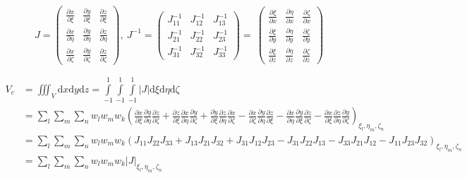 \documentclass[11pt]{article}
\newcommand{\Vc}{V_c}
\newcommand{\xxi}{\frac{\partial x}{\partial \xi}}
\newcommand{\yxi}{\frac{\partial y}{\partial \xi}}
\newcommand{\zxi}{\frac{\partial z}{\partial \xi}}
\newcommand{\xeta}{\frac{\partial x}{\partial \eta}}
\newcommand{\yeta}{\frac{\partial y}{\partial \eta}}
\newcommand{\zeeta}{\frac{\partial z}{\partial \eta}}
\newcommand{\xzeta}{\frac{\partial x}{\partial \zeta}}
\newcommand{\yzeta}{\frac{\partial y}{\partial \zeta}}
\newcommand{\zzeta}{\frac{\partial z}{\partial \zeta}}
\newcommand{\xix}{\frac{\partial \xi}{\partial x}}
\newcommand{\xiy}{\frac{\partial \xi}{\partial y}}
\newcommand{\xiz}{\frac{\partial \xi}{\partial z}}
\newcommand{\etax}{\frac{\partial \eta}{\partial x}}
\newcommand{\etay}{\frac{\partial \eta}{\partial y}}
\newcommand{\etaz}{\frac{\partial \eta}{\partial z}}
\newcommand{\zetax}{\frac{\partial \zeta}{\partial x}}
\newcommand{\zetay}{\frac{\partial \zeta}{\partial y}}
\newcommand{\zetaz}{\frac{\partial \zeta}{\partial z}}
\newcommand{\md}{\mbox{d}}
\newcommand{\Int}{\int\limits}
\begin{document}
\begin{enumerate}
 \begin{equation*}
    J =
    \begin{pmatrix}
    \xxi & \yxi  & \zxi   \\
    \xeta & \yeta & \zeeta   \\
    \xzeta & \yzeta & \zzeta
    \end{pmatrix},\:
    J^{-1} =
    \begin{pmatrix}
    J_{11}^{-1} & J_{12}^{-1}  &  J_{13}^{-1}  \\
    J_{21}^{-1} & J_{22}^{-1} & J_{23}^{-1}   \\
    J_{31}^{-1} & J_{32}^{-1} & J_{33}^{-1}
    \end{pmatrix} =\:
    \begin{pmatrix}
    \xix & \etax  & \zetax   \\
    \xiy & \etay & \zetay   \\
    \xiz & \etaz & \zetaz
    \end{pmatrix}
\end{equation*}

    \begin{align*}
    \Vc &= \iiint_V \md x \md y \md z = \Int_{-1}^{1}  \Int_{-1}^{1} \Int_{-1}^{1} |J| \md \xi \md \eta \md \zeta \\
    &= \sum_l \sum_m \sum_n w_l w_m w_k \left( \xxi \yeta \zzeta + \zxi \xeta \yzeta + \yxi \zeeta \xzeta - \xzeta \yeta \zxi - \xeta \yxi \zzeta - \xxi \zeeta \yzeta \right)_{\xi_l, \eta_m, \zeta_n}\\
    &= \sum_l \sum_m \sum_n w_l w_m w_k \left( J_{11} J_{22} J_{33} + J_{13} J_{21} J_{32} + J_{31} J_{12} J_{23} - J_{31} J_{22} J_{13} - J_{33} J_{21} J_{12} -J_{11} J_{23} J_{32}\right)_{\xi_l, \eta_m, \zeta_n} \\
    &= \sum_l \sum_m \sum_n w_l w_m w_k |J|_{\xi_l, \eta_m, \zeta_n}
    \end{align*}


\end{enumerate}
\end{document}
